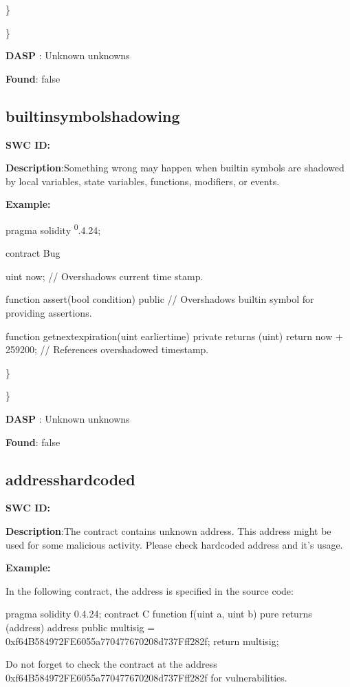 \documentclass{article}
\begin{document}
\} 

\} 

\textbf{DASP} : Unknown unknowns

\textbf{Found}: false

\subsection{builtin\textunderscore symbol\textunderscore shadowing} 
\textbf{SWC \textunderscore ID:} 

\textbf{Description}:Something wrong may happen when built\textendash in symbols are shadowed by local variables, state variables, functions, modifiers, or events.


\textbf{Example:} 

pragma solidity \textsuperscript0.4.24;

contract Bug {
    uint now; // Overshadows current time stamp.

    function assert(bool condition) public {
        // Overshadows built\textendash in symbol for providing assertions.
    }

    function get\textunderscore next\textunderscore expiration(uint earlier\textunderscore time) private returns (uint) {
        return now + 259200; // References overshadowed timestamp.
    }
}

\} 

\} 

\textbf{DASP} : Unknown unknowns

\textbf{Found}: false

\subsection{address\textunderscore hardcoded} 
\textbf{SWC \textunderscore ID:} 

\textbf{Description}:The contract contains unknown address. This address might be used for some malicious activity. Please check hardcoded address and it's usage.


\textbf{Example:} 

In the following contract, the address is specified in the source code:

pragma solidity 0.4.24;
contract C {
  function f(uint a, uint b) pure returns (address) {
    address public multisig = 0xf64B584972FE6055a770477670208d737Fff282f;
    return multisig;
        }
}

Do not forget to check the contract at the address 0xf64B584972FE6055a770477670208d737Fff282f for vulnerabilities.
\end{document}
